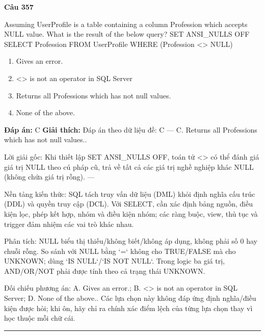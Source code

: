\documentclass[11pt,a4paper]{article}
\newenvironment{question}[1]{%
  \par\vspace{1em}\noindent\textbf{\large Câu #1}\par\vspace{0.4em}
}{%
  \par\vspace{1em}\hrule\vspace{0.6em}
}
\newenvironment{choices}{%
  \begin{enumerate}[label=\textbf{\Alph*.},leftmargin=2.2em,itemsep=2pt,topsep=3pt]
}{%
  \end{enumerate}
}
\newcommand{\choice}{\item}
\begin{document}
\begin{question}{357}
Assuming UserProfile is a table containing a column Profession which accepts NULL value. What is the result of the below query? SET ANSI_NULLS OFF SELECT Profession FROM UserProfile WHERE (Profession <> NULL)
\begin{choices}
\choice Gives an error.
\choice <> is not an operator in SQL Server
\choice Returns all Professions which has not null values.
\choice None of the above.
\end{choices}
\textbf{Đáp án:} C
\textbf{Giải thích:} Đáp án theo dữ liệu đề: C — C. Returns all Professions which has not null values..

Lời giải gốc: Khi thiết lập SET ANSI_NULLS OFF, toán tử <> có thể đánh giá giá trị NULL theo cú pháp cũ, trả về tất cả các giá trị nghề nghiệp khác NULL (không chứa giá trị rỗng). ---

Nền tảng kiến thức: SQL tách truy vấn dữ liệu (DML) khỏi định nghĩa cấu trúc (DDL) và quyền truy cập (DCL). Với SELECT, cần xác định bảng nguồn, điều kiện lọc, phép kết hợp, nhóm và điều kiện nhóm; các ràng buộc, view, thủ tục và trigger đảm nhiệm các vai trò khác nhau.

Phân tích: NULL biểu thị thiếu/không biết/không áp dụng, không phải số 0 hay chuỗi rỗng. So sánh với NULL bằng `=` không cho TRUE/FALSE mà cho UNKNOWN; dùng `IS NULL`/`IS NOT NULL`. Trong logic ba giá trị, AND/OR/NOT phải được tính theo cả trạng thái UNKNOWN.

Đối chiếu phương án: A. Gives an error.; B. <> is not an operator in SQL Server; D. None of the above.. Các lựa chọn này không đáp ứng định nghĩa/điều kiện được hỏi; khi ôn, hãy chỉ ra chính xác điểm lệch của từng lựa chọn thay vì học thuộc mỗi chữ cái.
\end{question}
\end{document}
